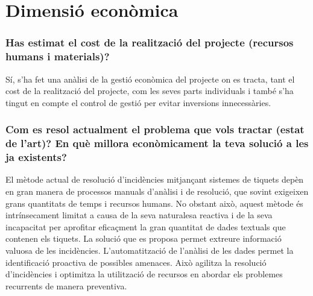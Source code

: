 \section{Dimensió econòmica}

\subsubsection{Has estimat el cost de la realització del projecte (recursos humans i materials)?}
Sí, s'ha fet una anàlisi de la gestió econòmica del projecte on es tracta, tant el cost de la realització del projecte, com les seves parts individuals i també s'ha tingut en compte el control de gestió per evitar inversions innecessàries.

\subsubsection{Com es resol actualment el problema que vols tractar (estat de l'art)? En què millora econòmicament la teva solució a les ja existents?}
El mètode actual de resolució d'incidències mitjançant sistemes de tiquets depèn en gran manera de processos manuals d'anàlisi i de resolució, que sovint exigeixen grans quantitats de temps i recursos humans. No obstant això, aquest mètode és intrínsecament limitat a causa de la seva naturalesa reactiva i de la seva incapacitat per aprofitar eficaçment la gran quantitat de dades textuals que contenen els tiquets. La solució que es proposa permet extreure informació valuosa de les incidències. L'automatització de l'anàlisi de les dades permet la identificació proactiva de possibles amenaces. Això agilitza la resolució d'incidències i optimitza la utilització de recursos en abordar els problemes recurrents de manera preventiva.
